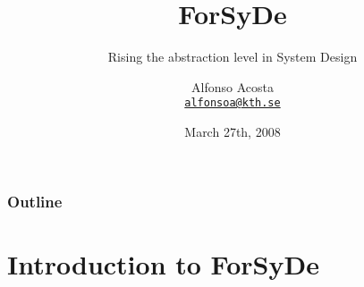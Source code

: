 \documentclass{beamer}
\title%
{ForSyDe}
\subtitle{Rising the abstraction level in System Design}
\author[A.Acosta] %
{Alfonso Acosta\\
\footnotesize \href{mailto:alfonsoa@kth.se}{\nolinkurl{alfonsoa@kth.se}}}
\institute[KTH] %
{SAM/ECS/ICT/KTH\\Royal Institute of Technology, Stockholm}
\date%
{March 27th, 2008}
\begin{document}
\begin{frame}
  \titlepage
\end{frame}

\begin{frame}
  \frametitle{Outline}
  \tableofcontents[pausesections]
\end{frame}






\section{Introduction to ForSyDe}

\beamerdefaultoverlayspecification{<+->}
\end{document}
